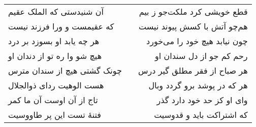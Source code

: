 \begin{center}
\begin{longtable}{l p{0.5cm} r}
آن شنیدستی که الملک عقیم
&&
قطع خویشی کرد ملکت‌جو ز بیم
\\
که عقیمست و ورا فرزند نیست
&&
هم‌چو آتش با کسش پیوند نیست
\\
هر چه یابد او بسوزد بر درد
&&
چون نیابد هیچ خود را می‌خورد
\\
هیچ شو وا ره تو از دندان او
&&
رحم کم جو از دل سندان او
\\
چونک گشتی هیچ از سندان مترس
&&
هر صباح از فقر مطلق گیر درس
\\
هست الوهیت ردای ذوالجلال
&&
هر که در پوشد برو گردد وبال
\\
تاج از آن اوست آن ما کمر
&&
وای او کز حد خود دارد گذر
\\
فتنهٔ تست این پر طاووسیت
&&
که اشتراکت باید و قدوسیت
\\
\end{longtable}
\end{center}
